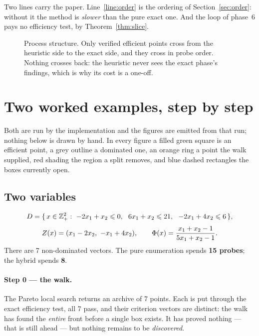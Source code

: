 \documentclass[11pt,a4paper]{article}
\begin{document}
\noindent
Two lines carry the paper.  Line~\ref{line:order} is the ordering of
Section~\ref{sec:order}: without it the method is \emph{slower} than the pure
exact one.  And the loop of phase~6 pays no efficiency test, by
Theorem~\ref{thm:slice}.

\begin{figure}[h]
\centering
{}
\caption{Process structure.  Only verified efficient points cross from the
heuristic side to the exact side, and they cross in probe order.  Nothing
crosses back: the heuristic never sees the exact phase's findings, which is why
its cost is a one-off.}
\label{fig:process}
\end{figure}

\section{Two worked examples, step by step}
\label{sec:examples}

Both are run by the implementation and the figures are emitted from that run;
nothing below is drawn by hand.  In every figure a filled green square is an
efficient point, a grey outline a dominated one, an orange ring a point the
walk supplied, red shading the region a split removes, and blue dashed
rectangles the boxes currently open.

\subsection{Two variables}
\label{sec:exA}

\[
  \Dset = \{\, x \in \Zint^{2}_{+} :\ -2x_1 + x_2 \leqslant 0,\ \
  6x_1 + x_2 \leqslant 21,\ \ -2x_1 + 4x_2 \leqslant 6 \,\},
\]
\[
  Z(x) = (x_1 - 2x_2,\ -x_1 + 4x_2), \qquad
  \Phi(x) = \frac{x_1 + x_2 - 1}{5x_1 + x_2 - 1} .
\]
There are 7 non-dominated vectors.  The pure enumeration spends \textbf{15
probes}; the hybrid spends \textbf{8}.

\paragraph{Step 0 --- the walk.}  The Pareto local search returns an archive of
7 points.  Each is put through the exact efficiency test, all 7 pass, and their
criterion vectors are distinct: the walk has found the \emph{entire} front
before a single box exists.  It has proved nothing --- that is still ahead ---
but nothing remains to be \emph{discovered}.

\begin{center}\end{center}
\end{document}
